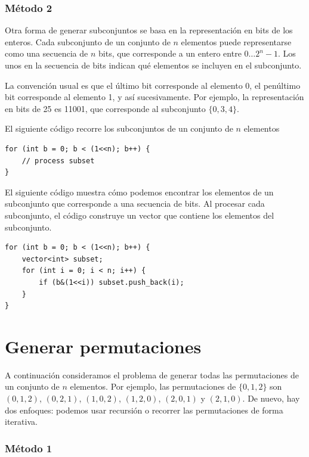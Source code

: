 \subsubsection{Método 2}

Otra forma de generar subconjuntos se basa en
la representación en bits de los enteros.
Cada subconjunto de un conjunto de $n$ elementos
puede representarse como una secuencia de $n$ bits,
que corresponde a un entero entre $0 \ldots 2^n-1$.
Los unos en la secuencia de bits indican
qué elementos se incluyen en el subconjunto.

La convención usual es que
el último bit corresponde al elemento 0,
el penúltimo bit corresponde al elemento 1,
y así sucesivamente.
Por ejemplo, la representación en bits de 25
es 11001, que corresponde al subconjunto $\{0,3,4\}$.

El siguiente código recorre los subconjuntos
de un conjunto de $n$ elementos

\begin{lstlisting}
for (int b = 0; b < (1<<n); b++) {
    // process subset
}
\end{lstlisting}

El siguiente código muestra cómo podemos encontrar
los elementos de un subconjunto que corresponde a una secuencia de bits.
Al procesar cada subconjunto,
el código construye un vector que contiene los
elementos del subconjunto.

\begin{lstlisting}
for (int b = 0; b < (1<<n); b++) {
    vector<int> subset;
    for (int i = 0; i < n; i++) {
        if (b&(1<<i)) subset.push_back(i);
    }
}
\end{lstlisting}

\section{Generar permutaciones}


A continuación consideramos el problema de generar
todas las permutaciones de un conjunto de $n$ elementos.
Por ejemplo, las permutaciones de $\{0,1,2\}$ son
$(0,1,2)$, $(0,2,1)$, $(1,0,2)$, $(1,2,0)$,
$(2,0,1)$ y $(2,1,0)$.
De nuevo, hay dos enfoques:
podemos usar recursión o recorrer las
permutaciones de forma iterativa.

\subsubsection{Método 1}

